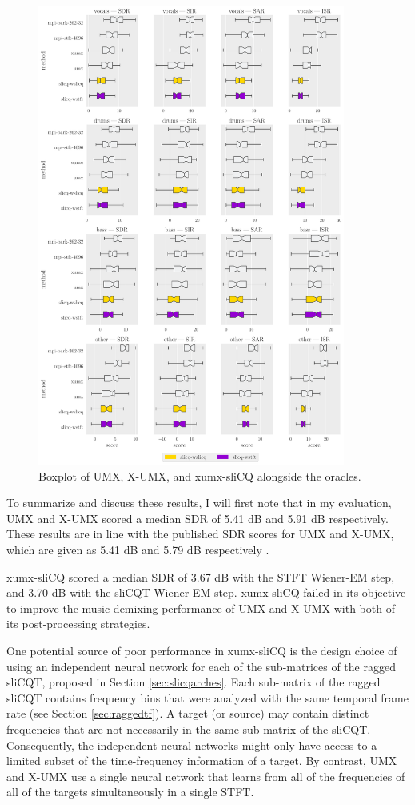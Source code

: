 \documentclass[report.tex]{subfiles}
\begin{document}
\begin{figure}[ht]
	\centering
	\includegraphics[width=0.9\textwidth]{./images-bss/boxplot_full.pdf}
	\caption{Boxplot of UMX, X-UMX, and xumx-sliCQ alongside the oracles.}
	\label{fig:bssboxplot}
\end{figure}

To summarize and discuss these results, I will first note that in my evaluation, UMX and X-UMX scored a median SDR of 5.41 dB and 5.91 dB respectively. These results are in line with the published SDR scores for UMX and X-UMX, which are given as 5.41 dB and 5.79 dB respectively \parencite[4]{xumx}.

xumx-sliCQ scored a median SDR of 3.67 dB with the STFT Wiener-EM step, and 3.70 dB with the sliCQT Wiener-EM step. xumx-sliCQ failed in its objective to improve the music demixing performance of UMX and X-UMX with both of its post-processing strategies.

One potential source of poor performance in xumx-sliCQ is the design choice of using an independent neural network for each of the sub-matrices of the ragged sliCQT, proposed in Section \ref{sec:slicqarches}. Each sub-matrix of the ragged sliCQT contains frequency bins that were analyzed with the same temporal frame rate (see Section \ref{sec:raggedtf}). A target (or source) may contain distinct frequencies that are not necessarily in the same sub-matrix of the sliCQT. Consequently, the independent neural networks might only have access to a limited subset of the time-frequency information of a target. By contrast, UMX and X-UMX use a single neural network that learns from all of the frequencies of all of the targets simultaneously in a single STFT.
\end{document}
